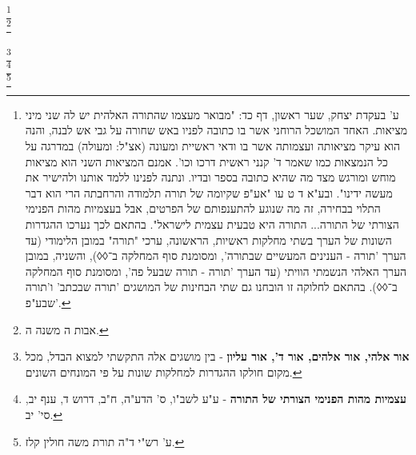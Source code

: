 \begin{multicols}{2}
\\

\footnote{ ע' בעקדת יצחק, שער ראשון, דף כד: "מבואר מעצמו שהתורה האלהית יש לה שני מיני מציאות. האחד המושכל הרוחני אשר בו כתובה לפניו באש שחורה על גבי אש לבנה, והנה הוא עיקר מציאותה ועצמותה אשר בו ודאי ראשיית ומעונה (אצ"ל: ומעולה) במדרגה על כל הנמצאות כמו שאמר ד' קנני ראשית דרכו וכו'. אמנם המציאות השני הוא מציאות מוחש ומורגש מצד מה שהיא כתובה בספר ובדיו. ונתנה לפנינו ללמד אותנו ולהישיר את מעשה ידינו". ובע"א ד ט עו "אע"פ שקיומה של תורה תלמודה והרחבתה הרי הוא דבר התלוי בבחירה, זה מה שנוגע להתענפותם של הפרטים, אבל בעצמיות מהות הפנימי הצורתי של התורה... התורה היא טבעית עצמית לישראל". בהתאם לכך נערכו ההגדרות השונות של הערך בשתי מחלקות ראשיות, הראשונה, ערכי "תורה" במובן הלימודי (עד הערך 'תורה - הענינים המעשיים שבתורה', ומסומנת סוף המחלקה ב־◊◊), והשניה, במובן הערך האלהי הנשמתי הוויתי (עד הערך 'תורה - תורה שבעל פה', ומסומנת סוף המחלקה ב־◊◊). בהתאם לחלוקה זו הובחנו גם שתי הבחינות של המושגים 'תורה שבכתב' ו'תורה שבע"פ'. }\\

\footnote{ אבות ה משנה ה.}\\

\\

\footnote{ \textbf{אור}\textbf{ אלהי, אור אלהים, אור ד', אור עליון }- בין מושגים אלה התקשתי למצוא הבדל, מכל מקום חולקו ההגדרות למחלקות שונות על פי המונחים השונים.}\\

\footnote{ \textbf{עצמיות מהות הפנימי הצורתי של התורה }- ע"ע לשב"ו, ס' הדע"ה, ח"ב, דרוש ד, ענף יב, סי' יב.}\\

\footnote{ ע' רש"י ד"ה תורת משה חולין קלז.}\\


\end{multicols}
